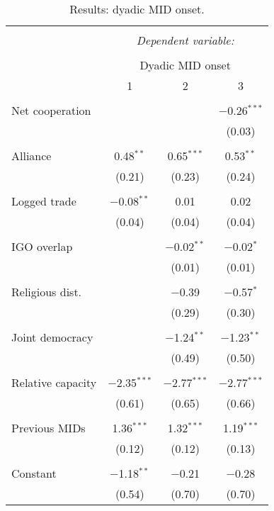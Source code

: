 \documentclass[10pt,]{article}
\begin{document}
\begin{table}[!htbp] \centering 
  \caption{\label{tab:MidTable}Results: dyadic MID onset.} 
  \label{} 
\begin{tabular}{@{\extracolsep{5pt}}lccc} 
\\[-1.8ex]\hline 
\hline \\[-1.8ex] 
 & \multicolumn{3}{c}{\textit{Dependent variable:}} \\ 
\cline{2-4} 
\\[-1.8ex] & \multicolumn{3}{c}{Dyadic MID onset} \\ 
 & 1 & 2 & 3 \\ 
\hline \\[-1.8ex] 
 Net cooperation &  &  & $-$0.26$^{***}$ \\ 
  &  &  & (0.03) \\ 
  & & & \\ 
 Alliance & 0.48$^{**}$ & 0.65$^{***}$ & 0.53$^{**}$ \\ 
  & (0.21) & (0.23) & (0.24) \\ 
  & & & \\ 
 Logged trade & $-$0.08$^{**}$ & 0.01 & 0.02 \\ 
  & (0.04) & (0.04) & (0.04) \\ 
  & & & \\ 
 IGO overlap &  & $-$0.02$^{**}$ & $-$0.02$^{*}$ \\ 
  &  & (0.01) & (0.01) \\ 
  & & & \\ 
 Religious dist. &  & $-$0.39 & $-$0.57$^{*}$ \\ 
  &  & (0.29) & (0.30) \\ 
  & & & \\ 
 Joint democracy &  & $-$1.24$^{**}$ & $-$1.23$^{**}$ \\ 
  &  & (0.49) & (0.50) \\ 
  & & & \\ 
 Relative capacity & $-$2.35$^{***}$ & $-$2.77$^{***}$ & $-$2.77$^{***}$ \\ 
  & (0.61) & (0.65) & (0.66) \\ 
  & & & \\ 
 Previous MIDs & 1.36$^{***}$ & 1.32$^{***}$ & 1.19$^{***}$ \\ 
  & (0.12) & (0.12) & (0.13) \\ 
  & & & \\ 
 Constant & $-$1.18$^{**}$ & $-$0.21 & $-$0.28 \\ 
  & (0.54) & (0.70) & (0.70) \\ 

\end{tabular}
\end{table}
\end{document}
